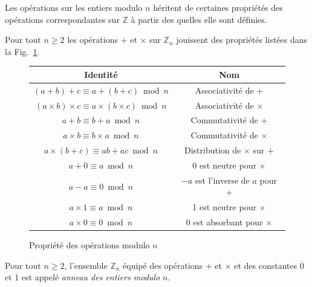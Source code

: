 \documentclass[french,course,oneside,theoremnosection]{lecture}
\newcommand{\Z}{\mathbb{Z}}
\begin{document}
Les opérations sur les entiers modulo $n$ héritent de certaines propriétés des opérations correspondantes sur $\Z$ à partir des quelles elle sont définies.

\begin{proposition}\label{prop:zn}
Pour tout $n\geq 2$ les opérations $+$ et $\times$ sur $\Z_n$ jouissent des propriétés listées dans la Fig.~\ref{fig:gfr}.
\begin{figure}
\begin{center}
  \begin{tabular}{|c|c|}
    \hline
     Identité & Nom \\
    \hline
     $(a + b) + c \equiv a + (b + c) \bmod{n}$ & Associativité de $+$ \\
    \hline
     $(a \times b) \times c \equiv a \times (b \times c) \bmod{n}$ & Associativité de $\times$ \\
    \hline
     $a + b \equiv b + a \bmod{n}$ & Commutativité de $+$ \\
    \hline
     $a \times b \equiv b \times a \bmod{n}$ & Commutativité de $\times$ \\
    \hline
     $a \times (b + c) \equiv a b + ac \bmod{n}$ & Distribution de $\times$ sur $+$ \\
    \hline
     $a + 0 \equiv a \bmod{n}$ & 0 est neutre pour $\times$ \\
     \hline
     $a - a \equiv 0 \bmod{n}$ & $-a$ est l'inverse de $a$ pour $+$\\
    \hline
     $a \times 1 \equiv a \bmod{n}$ & 1 est neutre pour $\times$ \\
    \hline
     $a \times 0 \equiv 0 \bmod{n}$ & 0 est absorbant pour $\times$\\
     \hline
  \end{tabular}
\end{center}\caption{Propriété des opérations modulo $n$}\label{fig:gfr}
\end{figure}
\end{proposition}

\begin{definition}
Pour tout $n\geq 2$, l'ensemble $\Z_n$ équipé des opérations $+$ et $\times$ et des constantes $\overline{0}$ et $\overline{1}$ est appelé \emph{anneau des entiers modulo $n$}.
\end{definition}
\end{document}
